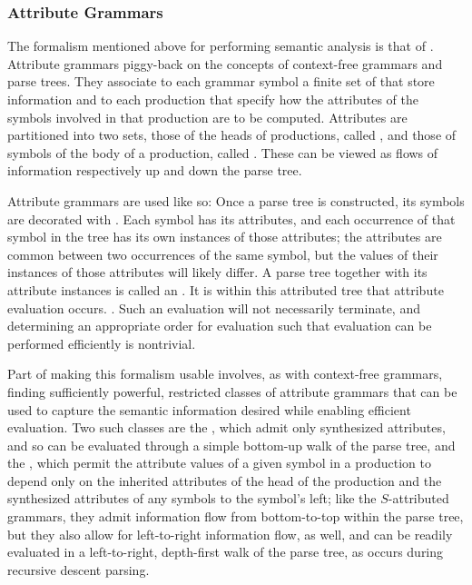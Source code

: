 \subsubsection{Attribute Grammars}
The formalism mentioned above for performing semantic analysis is that of . Attribute grammars piggy-back on the concepts of context-free grammars and parse trees. They associate to each grammar symbol a finite set of  that store information and to each production  that specify how the attributes of the symbols involved in that production are to be computed. Attributes are partitioned into two sets, those of the heads of productions, called , and those of symbols of the body of a production, called . These can be viewed as flows of information respectively up and down the parse tree.

Attribute grammars are used like so: Once a parse tree is constructed, its symbols are decorated with . Each symbol has its attributes, and each occurrence of that symbol in the tree has its own instances of those attributes; the attributes are common between two occurrences of the same symbol, but the values of their instances of those attributes will likely differ. A parse tree together with its attribute instances is called an . It is within this attributed tree that attribute evaluation occurs. . Such an evaluation will not necessarily terminate, and determining an appropriate order for evaluation such that evaluation can be performed efficiently is nontrivial.%

Part of making this formalism usable involves, as with context-free grammars, finding sufficiently powerful, restricted classes of attribute grammars that can be used to capture the semantic information desired while enabling efficient evaluation. Two such classes are the , which admit only synthesized attributes, and so can be evaluated through a simple bottom-up walk of the parse tree, and the , which permit the attribute values of a given symbol in a production to depend only on the inherited attributes of the head of the production and the synthesized attributes of any symbols to the symbol's left; like the $S$-attributed grammars, they admit information flow from bottom-to-top within the parse tree, but they also allow for left-to-right information flow, as well, and can be readily evaluated in a left-to-right, depth-first walk of the parse tree, as occurs during recursive descent parsing.

